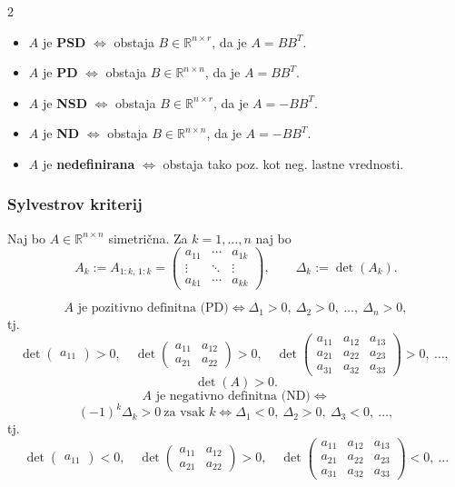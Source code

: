 \documentclass{article}
\begin{document}
\begin{multicols}{2}
	\begin{small}
		\begin{itemize}
			\item \( A \) je \textbf{PSD} \( \Leftrightarrow \) obstaja \( B \in \mathbb{R}^{n \times r} \), da je \( A = BB^T \).
			\item \( A \) je \textbf{PD} \( \Leftrightarrow \) obstaja \( B \in \mathbb{R}^{n \times n} \), da je \( A = BB^T \).
			\item \( A \) je \textbf{NSD} \( \Leftrightarrow \) obstaja \( B \in \mathbb{R}^{n \times r} \), da je \( A = -BB^T \).
			\item \( A \) je \textbf{ND} \( \Leftrightarrow \) obstaja \( B \in \mathbb{R}^{n \times n} \), da je \( A = -BB^T \).
			\item \( A \) je \textbf{nedefinirana} \( \Leftrightarrow \) obstaja tako poz. kot neg. lastne vrednosti.
		\end{itemize}
	\end{small}

	\subsubsection{Sylvestrov kriterij}
	Naj bo $A\in\mathbb{R}^{n\times n}$ simetrična. Za $k=1,\dots,n$ naj bo
	\[
		A_k := A_{1:k,\,1:k}
		=
		\begin{pmatrix}
			a_{11} & \cdots & a_{1k} \\
			\vdots & \ddots & \vdots \\
			a_{k1} & \cdots & a_{kk}
		\end{pmatrix},
		\qquad
		\Delta_k := \det(A_k).
	\]

	\[
		A \text{ je pozitivno definitna (PD)}
		\iff
		\Delta_1>0,\ \Delta_2>0,\ \dots,\ \Delta_n>0,
	\]
	tj.
	\[
		\det\!\begin{pmatrix} a_{11}\end{pmatrix}>0,\quad
		\det\!\begin{pmatrix} a_{11}&a_{12}\\ a_{21}&a_{22}\end{pmatrix}>0,\quad
		\det\!\begin{pmatrix} a_{11}&a_{12}&a_{13}\\ a_{21}&a_{22}&a_{23}\\ a_{31}&a_{32}&a_{33}\end{pmatrix}>0,\ \dots,\
	\]
	\[
		\det(A)>0.
	\]
	\[
		A \text{ je negativno definitna (ND)}
		\iff
	\]
	\[
		(-1)^k\Delta_k>0\ \text{za vsak }k
		\iff
		\Delta_1<0,\ \Delta_2>0,\ \Delta_3<0,\ \dots,
	\]
	tj.
	\[
		\det\!\begin{pmatrix} a_{11}\end{pmatrix}<0,\quad
		\det\!\begin{pmatrix} a_{11}&a_{12}\\ a_{21}&a_{22}\end{pmatrix}>0,\quad
		\det\!\begin{pmatrix} a_{11}&a_{12}&a_{13}\\ a_{21}&a_{22}&a_{23}\\ a_{31}&a_{32}&a_{33}\end{pmatrix}<0,\ \dots
	\]


\end{multicols}
\end{document}
